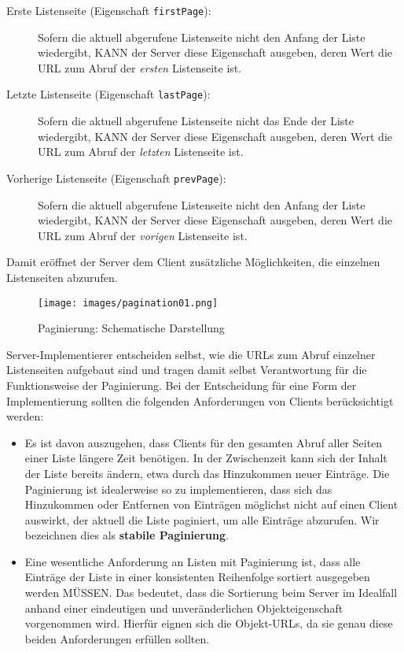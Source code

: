 \documentclass[,a4paper]{article}
\makeatletter
\def\maxwidth{\ifdim\Gin@nat@width>\linewidth\linewidth
\else\Gin@nat@width\fi}
\let\Oldincludegraphics\includegraphics
\renewcommand{\includegraphics}[1]{\Oldincludegraphics[width=\maxwidth]{#1}}
\makeatother
\begin{document}
\begin{description}
\item[Erste Listenseite (Eigenschaft \texttt{firstPage}):]
Sofern die aktuell abgerufene Listenseite nicht den Anfang der Liste
wiedergibt, KANN der Server diese Eigenschaft ausgeben, deren Wert die
URL zum Abruf der \emph{ersten} Listenseite ist.
\item[Letzte Listenseite (Eigenschaft \texttt{lastPage}):]
Sofern die aktuell abgerufene Listenseite nicht das Ende der Liste
wiedergibt, KANN der Server diese Eigenschaft ausgeben, deren Wert die
URL zum Abruf der \emph{letzten} Listenseite ist.
\item[Vorherige Listenseite (Eigenschaft \texttt{prevPage}):]
Sofern die aktuell abgerufene Listenseite nicht den Anfang der Liste
wiedergibt, KANN der Server diese Eigenschaft ausgeben, deren Wert die
URL zum Abruf der \emph{vorigen} Listenseite ist.
\end{description}

Damit eröffnet der Server dem Client zusätzliche Möglichkeiten, die
einzelnen Listenseiten abzurufen.

\begin{figure}[htbp]
\centering
\texttt{[image: images/pagination01.png]}
\caption{Paginierung: Schematische Darstellung}
\end{figure}

Server-Implementierer entscheiden selbst, wie die URLs zum Abruf
einzelner Listenseiten aufgebaut sind und tragen damit selbst
Verantwortung für die Funktionsweise der Paginierung. Bei der
Entscheidung für eine Form der Implementierung sollten die folgenden
Anforderungen von Clients berücksichtigt werden:

\begin{itemize}
\item
  Es ist davon auszugehen, dass Clients für den gesamten Abruf aller
  Seiten einer Liste längere Zeit benötigen. In der Zwischenzeit kann
  sich der Inhalt der Liste bereits ändern, etwa durch das Hinzukommen
  neuer Einträge. Die Paginierung ist idealerweise so zu implementieren,
  dass sich das Hinzukommen oder Entfernen von Einträgen möglichst nicht
  auf einen Client auswirkt, der aktuell die Liste paginiert, um alle
  Einträge abzurufen. Wir bezeichnen dies als \textbf{stabile
  Paginierung}.
\item
  Eine wesentliche Anforderung an Listen mit Paginierung ist, dass alle
  Einträge der Liste in einer konsistenten Reihenfolge sortiert
  ausgegeben werden MÜSSEN. Das bedeutet, dass die Sortierung beim
  Server im Idealfall anhand einer eindeutigen und unveränderlichen
  Objekteigenschaft vorgenommen wird. Hierfür eignen sich die
  Objekt-URLs, da sie genau diese beiden Anforderungen erfüllen sollten.
\end{itemize}
\end{document}

